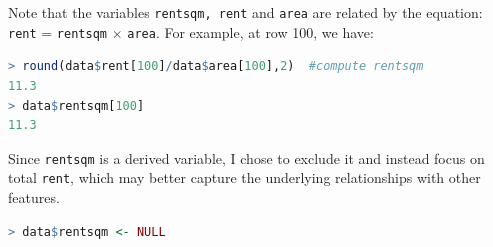 \documentclass[15pt,a4paper]{report}
\begin{document}
Note that the variables \lstinline[language=R]|rentsqm, rent| and \lstinline[language=R]|area| are related by the equation: \lstinline[language=R]|rent| = \lstinline[language=R]|rentsqm| $\times$ \lstinline[language=R]|area|. For example, at row 100, we have:

\begin{lstlisting}[language=R]
> round(data$rent[100]/data$area[100],2)  #compute rentsqm
11.3
> data$rentsqm[100]
11.3
\end{lstlisting}
Since \lstinline[language=R]|rentsqm| is a derived variable, I chose to exclude it and instead focus on total \lstinline[language=R]|rent|, which may better capture the underlying relationships with other features.
\begin{lstlisting}[language=R]
> data$rentsqm <- NULL
\end{lstlisting}
\end{document}
